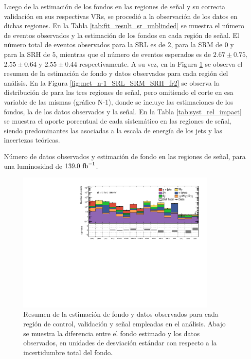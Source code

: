 Luego de la estimación de los fondos en las regiones de señal y su correcta validación en sus respectivas VRs, se procedió a la observación de los datos en dichas regiones. En la Tabla \ref{tab:fit_result_sr_unblinded} se muestra el número de eventos observados y la estimación de los fondos en cada región de señal. El número total de eventos observados para la SRL es de $2$, para la SRM de $0$ y para la SRH de $5$, mientras que el número de eventos esperados es de $2.67\pm0.75$, $2.55\pm0.64$ y $2.55\pm0.44$ respectivamente. A su vez, en la Figura \ref{fig:regions_pulls_unblinded} se observa el resumen de la estimación de fondo y datos observados para cada región del análisis. En la Figura \ref{fig:met_n-1_SRL_SRM_SRH_fr2} se observa la distribución de \met para las tres regiones de señal, pero omitiendo el corte en esa variable de las mismas (gráfico N-1), donde se incluye las estimaciones de los fondos, la de los datos observados y la señal. En la Tabla \ref{tab:syst_rel_impact} se muestra el aporte porcentual de cada sistemático en las regiones de señal, siendo predominantes las asociadas a la escala de energía de los jets y las incertezas teóricas.


\begin{table}[ht!]
  \centering
  \caption{Número de datos observados y estimación de fondo en las regiones de señal, para una luminosidad de $139.0\ \text{fb}^{-1}$.}
  
  \label{tab:fit_result_sr_unblinded}
\end{table}

\begin{figure}[ht!]
  \centering
  \includegraphics[width=0.89\textwidth]{images/results/fr2_unblind/regions_pull_significance.pdf}
  \caption{Resumen de la estimación de fondo y datos observados para cada región de control, validación y señal empleadas en el análisis. Abajo se muestra la diferencia entre el fondo estimado y los datos observados, en unidades de desviación estándar con respecto a la incertidumbre total del fondo.}
  \label{fig:regions_pulls_unblinded}
\end{figure}


